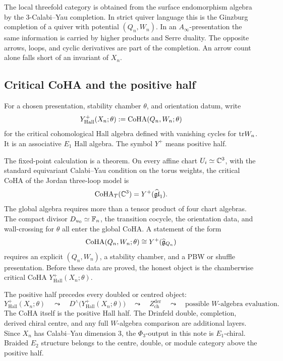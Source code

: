 The local threefold category is obtained from the surface endomorphism
algebra by the \(3\)-Calabi--Yau completion. In strict quiver language
this is the Ginzburg completion of a quiver with potential
\((Q_n,W_n)\). In an \(A_\infty\)-presentation the same information is
carried by higher products and Serre duality. The opposite arrows,
loops, and cyclic derivatives are part of the completion. An arrow
count alone falls short of an invariant of \(X_n\).

\subsection*{Critical CoHA and the positive half}

For a chosen presentation, stability chamber \(\theta\), and
orientation datum, write
\[
 Y^+_{\mathrm{Hall}}(X_n;\theta)
 :=\mathrm{CoHA}(Q_n,W_n;\theta)
\]
for the critical cohomological Hall algebra defined with vanishing
cycles for \(\mathrm{tr} W_n\). It is an associative \(E_1\) Hall algebra.
The symbol \(Y^+\) means positive half.

The fixed-point calculation is a theorem. On every affine chart
\(U_i\simeq\mathbb{C}^3\), with the standard equivariant Calabi--Yau condition
on the torus weights, the critical CoHA of the Jordan three-loop model is
\[
 \mathrm{CoHA}_T(\mathbb{C}^3)=Y^+(\widehat{\mathfrak{gl}}_1).
\]
The global algebra requires more than a tensor product of four chart
algebras. The compact divisor \(D_{u_0}\simeq\mathbb{F}_n\), the transition
cocycle, the orientation data, and wall-crossing for \(\theta\) all
enter the global CoHA. A statement of the form
\[
 \mathrm{CoHA}(Q_n,W_n;\theta)\cong Y^+(\widehat{\mathfrak{g}}_{Q_n})
\]
requires an explicit \((Q_n,W_n)\), a stability chamber, and a PBW or
shuffle presentation. Before these data are proved, the honest object
is the chamberwise critical CoHA \(Y^+_{\mathrm{Hall}}(X_n;\theta)\).

The positive half precedes every doubled or centred object:
\[
 Y^+_{\mathrm{Hall}}(X_n;\theta)
 \quad\leadsto\quad
 D^\wedge\!\bigl(Y^+_{\mathrm{Hall}}(X_n;\theta)\bigr)
 \quad\leadsto\quad
 Z^{\mathrm{der}}_{\mathrm{ch}}
 \quad\leadsto\quad
 \text{possible \(W\)-algebra evaluation}.
\]
The CoHA itself is the positive Hall half. The Drinfeld double,
completion, derived chiral centre, and any full \(W\)-algebra
comparison are additional layers. Since \(X_n\) has Calabi--Yau
dimension \(3\), the \(\Phi_3\)-output in this note is \(E_1\)-chiral.
Braided \(E_2\) structure belongs to the centre, double, or module
category above the positive half.

